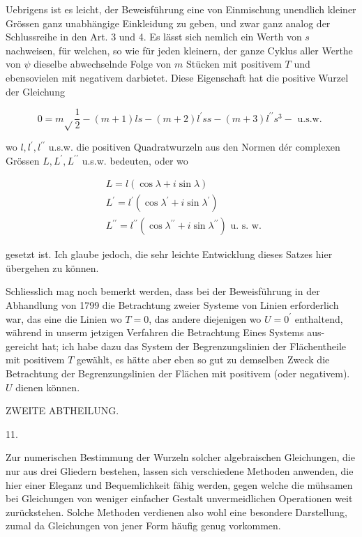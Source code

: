 \documentclass[10pt]{article}
\begin{document}
Uebrigens ist es leicht, der Beweisführung eine von Einmischung unendlich kleiner Grössen ganz unabhängige Einkleidung zu geben, und zwar ganz analog der Schlussreihe in den Art. 3 und 4. Es lässt sich nemlich ein Werth von \(s\) nachweisen, für welchen, so wie für jeden kleinern, der ganze Cyklus aller Werthe von \(\psi\) dieselbe abwechselnde Folge von \(m\) Stücken mit positivem \(T\) und ebensovielen mit negativem darbietet. Diese Eigenschaft hat die positive Wurzel der Gleichung

\[
0=m \sqrt{ } \frac{1}{2}-(m+1) l s-(m+2) l^{\prime} s s-(m+3) l^{\prime \prime} s^{3}-\text { u.s.w. }
\]

wo \(l, l^{\prime}, l^{\prime \prime}\) u.s.w. die positiven Quadratwurzeln aus den Normen dér complexen Grössen \(L, L^{\prime}, L^{\prime \prime}\) u.s.w. bedeuten, oder wo

\[
\begin{aligned}
& L=l(\cos \lambda+i \sin \lambda) \\
& L^{\prime}=l^{\prime}\left(\cos \lambda^{\prime}+i \sin \lambda^{\prime}\right) \\
& L^{\prime \prime}=l^{\prime \prime}\left(\cos \lambda^{\prime \prime}+i \sin \lambda^{\prime \prime}\right) \text { u. s. w. }
\end{aligned}
\]

gesetzt ist. Ich glaube jedoch, die sehr leichte Entwicklung dieses Satzes hier übergehen zu können.

Schliesslich mag noch bemerkt werden, dass bei der Beweisführung in der Abhandlung von 1799 die Betrachtung zweier Systeme von Linien erforderlich war, das eine die Linien wo \(T=0\), das andere diejenigen wo \(U=0^{\prime}\) enthaltend, während in unserm jetzigen Verfahren die Betrachtung Eines Systems aus-
gereicht hat; ich habe dazu das System der Begrenzungslinien der Flächentheile mit positivem \(T\) gewählt, es hätte aber eben so gut zu demselben Zweck die Betrachtung der Begrenzungslinien der Flächen mit positivem (oder negativem). \(U\) dienen können.

ZWEITE ABTHEILUNG.

11.

Zur numerischen Bestimmung der Wurzeln solcher algebraischen Gleichungen, die nur aus drei Gliedern bestehen, lassen sich verschiedene Methoden anwenden, die hier einer Eleganz und Bequemlichkeit fähig werden, gegen welche die mühsamen bei Gleichungen von weniger einfacher Gestalt unvermeidlichen Operationen weit zurückstehen. Solche Methoden verdienen also wohl eine besondere Darstellung, zumal da Gleichungen von jener Form häufig genug vorkommen.
\end{document}
